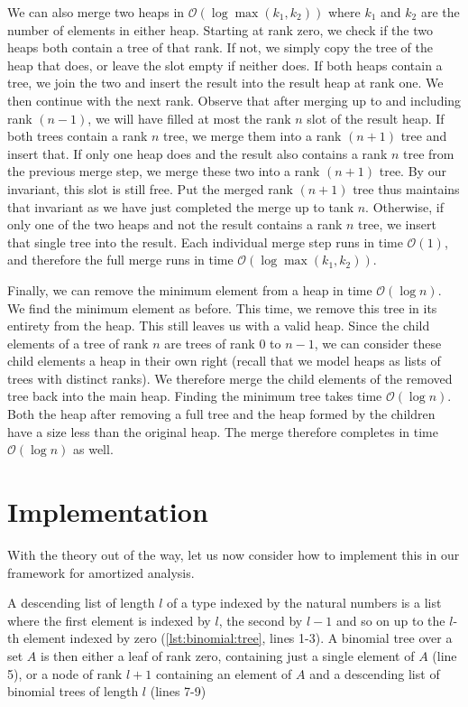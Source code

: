 We can also merge two heaps in $\mathcal O(\log \max(k_1, k_2))$ where $k_1$ and $k_2$ are the number of elements in either heap. Starting at rank zero, we check if the two heaps both contain a tree of that rank. If not, we simply copy the tree of the heap that does, or leave the slot empty if neither does. If both heaps contain a tree, we join the two and insert the result into the result heap at rank one. We then continue with the next rank. Observe that after merging up to and including rank $(n-1)$, we will have filled at most the rank $n$ slot of the result heap. If both trees contain a rank $n$ tree, we merge them into a rank $(n+1)$ tree and insert that. If only one heap does and the result also contains a rank $n$ tree from the previous merge step, we merge these two into a rank $(n+1)$ tree. By our invariant, this slot is still free. Put the merged rank $(n+1)$ tree thus maintains that invariant as we have just completed the merge up to tank $n$. Otherwise, if only one of the two heaps and not the result contains a rank $n$ tree, we insert that single tree into the result. Each individual merge step runs in time $\mathcal O(1)$, and therefore the full merge runs in time $\mathcal O(\log \max(k_1, k_2))$.

Finally, we can remove the minimum element from a heap in time $\mathcal O(\log n)$. We find the minimum element as before. This time, we remove this tree in its entirety from the heap. This still leaves us with a valid heap. Since the child elements of a tree of rank $n$ are trees of rank $0$ to $n-1$, we can consider these child elements a heap in their own right (recall that we model heaps as lists of trees with distinct ranks). We therefore merge the child elements of the removed tree back into the main heap. Finding the minimum tree takes time $\mathcal O(\log n)$. Both the heap after removing a full tree and the heap formed by the children have a size less than the original heap. The merge therefore completes in time $\mathcal O(\log n)$ as well.

\section{Implementation}
With the theory out of the way, let us now consider how to implement this in our framework for amortized analysis.

A descending list of length $l$ of a type indexed by the natural numbers is a list where the first element is indexed by $l$, the second by $l-1$ and so on up to the $l$-th element indexed by zero (\autoref{lst:binomial:tree}, lines 1-3). A binomial tree over a set $A$ is then either a leaf of rank zero, containing just a single element of $A$ (line 5), or a node of rank $l+1$ containing an element of $A$ and a descending list of binomial trees of length $l$ (lines 7-9)

